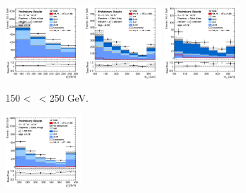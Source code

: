 \begin{figure}[h!]
    \begin{subfigure}[b]{\textwidth}
        \centering
        \includegraphics[width=0.32\textwidth]{Images/VH/Own_fit/prefit_VHcc/Region_distpTV_BMax250_BMin150_DCRHigh_J3_TTypent_incJet1_T1_L2_Y6051_Prefit.png}
        \includegraphics[width=0.32\textwidth]{Images/VH/Own_fit/prefit_VHcc/Region_distmBB_BMax250_BMin150_DCRHigh_J3_TTypelt_incJet1_T2_L2_Y6051_Prefit.png}
        \includegraphics[width=0.32\textwidth]{Images/VH/Own_fit/prefit_VHcc/Region_distmBB_BMax250_BMin150_DCRHigh_J3_TTypett_incJet1_T2_L2_Y6051_Prefit.png}
        \caption{150 < \ptv\ < 250 GeV.}
        \label{fig:plots_VHcc_2L_150_CRH_3J}
    \end{subfigure}
    \begin{subfigure}[b]{\textwidth}
        \centering
        \includegraphics[width=0.32\textwidth]{Images/VH/Own_fit/prefit_VHcc/Region_distpTV_BMin250_DCRHigh_J3_TTypent_incJet1_T1_L2_Y6051_Prefit.png}

\end{subfigure}
\end{figure}
